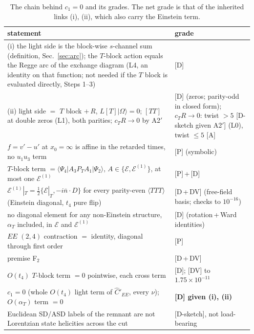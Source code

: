 \documentclass[aps,prl,onecolumn,superscriptaddress,nofootinbib]{revtex4-2}
\begin{document}
\begin{table}[!htbp]
\caption{\label{tab:c1}The chain behind $c_1=0$ and its grades. The net grade is that of the inherited links (i), (ii), which also
carry the Einstein term.}
\footnotesize
\begin{ruledtabular}
\begin{tabular}{L{11.6cm}L{4.8cm}}
statement & grade\\\hline
(i) the light side is the block-wise $s$-channel sum (definition, Sec.~\ref{sec:arc}); the $T$-block action equals the Regge arc of the exchange diagram (L4, an identity on that function; not needed if the $T$ block is evaluated directly, Steps 1--3) & [D]\\
(ii) light side $=$ $T$ block $+\,R$, $L[T]|\Omega\rangle=0$; $[TT]$ at double zeros (L1), both parities; $c_TR\to0$ by A2$'$ & [D] (zeros; parity-odd in closed form); $c_TR\to0$: twist $>5$ [D-sketch given A2$'$] (L0), twist $\le5$ [A]\\
$f=v'-u'$ at $x_0=\infty$ is affine in the retarded times, no $u_1u_3$ term & [P] (symbolic)\\
$T$-block term $=\langle\Psi_4|A_3P_TA_1|\Psi_2\rangle$, $A\in\{\mathcal E,\mathcal E^{(1)}\}$, at most one $\mathcal E^{(1)}$ & [P]\,+\,[D]\\
$\mathcal E^{(1)}|_T=\tfrac12\{\mathcal E|_T,-i\bar n\cdot D\}$ for every parity-even $\langle TTT\rangle$ (Einstein diagonal, $t_4$ pure flip) & [D\,+\,DV] (free-field basis; checks to $10^{-16}$)\\
no diagonal element for any non-Einstein structure, $\alpha_T$ included, in $\mathcal E$ and $\mathcal E^{(1)}$ & [D] (rotation\,+\,Ward identities)\\
$EE$ $(2,4)$ contraction $=$ identity, diagonal through first order & [P]\\
premise F$_2$ & [D\,+\,DV]\\
$O(t_4)$ $T$-block term $=0$ pointwise, each cross term & [D]; [DV] to $1.75\times10^{-11}$\\
\textbf{$c_1=0$} (whole $O(t_4)$ light term of $\hat C'_{EE}$, every $\nu$); $O(\alpha_T)$ term $=0$ & \textbf{[D] given (i), (ii)}\\
Euclidean SD/ASD labels of the remnant are not Lorentzian state helicities across the cut & [D-sketch], not load-bearing\\
\end{tabular}
\end{ruledtabular}
\end{table}
\end{document}
